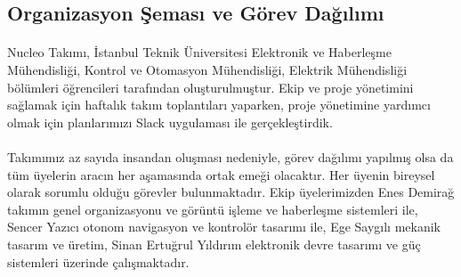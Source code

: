 \documentclass[12pt]{article}
\begin{document}
\begin{table}[h]
\centering
{}
\caption{Takım Üyeleri}
\label{tab:takim-uyeleri}
\end{table}

\subsection{Organizasyon Şeması ve Görev Dağılımı}

\paragraph{} Nucleo Takımı, İstanbul Teknik Üniversitesi Elektronik ve Haberleşme Mühendisliği, Kontrol ve Otomasyon Mühendisliği, Elektrik Mühendisliği bölümleri öğrencileri tarafından oluşturulmuştur. Ekip ve proje yönetimini sağlamak için haftalık takım toplantıları yaparken, proje yönetimine yardımcı olmak için planlarımızı Slack uygulaması ile gerçekleştirdik.

\paragraph{} Takımımız az sayıda insandan oluşması nedeniyle, görev dağılımı yapılmış olsa da tüm üyelerin aracın her aşamasında ortak emeği olacaktır. Her üyenin bireysel olarak sorumlu olduğu görevler bulunmaktadır. Ekip üyelerimizden Enes Demirağ takımın genel organizasyonu ve görüntü işleme ve haberleşme sistemleri ile, Sencer Yazıcı otonom navigasyon ve kontrolör tasarımı ile, Ege Saygılı mekanik tasarım ve üretim, Sinan Ertuğrul Yıldırım elektronik devre tasarımı ve güç sistemleri üzerinde çalışmaktadır.
\end{document}
